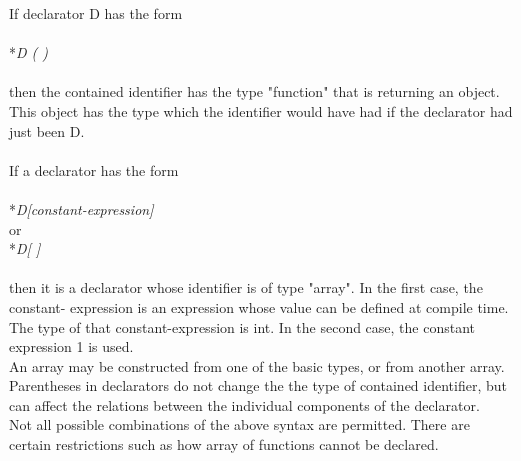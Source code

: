 If declarator D has the form\\
		\\*\indent\indent\textit{D ( )}\\\\
then the contained identifier has the type "function" that is returning an object. This object has the type which the identifier would have had if the declarator had just been D.\\\\
If a declarator has the form\\
		\\*\indent\indent\textit{D[constant-expression]}\\
or
		\\*\indent\indent\textit{D[ ]}\\\\
then it is a declarator whose identifier is of type "array". In the first case, the constant- expression is an expression whose value can be defined at compile time.  The type of that constant-expression is int. In the second case, the constant expression 1 is used. \\

An array may be constructed from one of the basic types, or from another array.\\

Parentheses in declarators do not change the the type of contained identifier, but can affect the relations between the individual components of the declarator.\\

Not all possible combinations of the above syntax are permitted. There are certain restrictions such as how array of functions cannot be declared.
